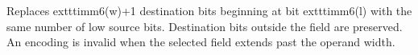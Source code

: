 Replaces 	exttt{imm6(w)+1} destination bits beginning at bit 	exttt{imm6(l)} with the same number of low source
bits. Destination bits outside the field are preserved. An encoding is invalid when the selected field extends
past the operand width.
